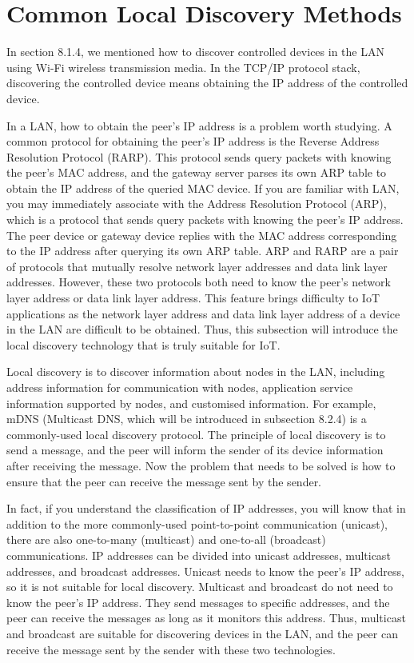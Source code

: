 \documentclass[a4paper,12pt]{book}
\begin{document}
\section{Common Local Discovery Methods}
In section 8.1.4, we mentioned how to discover controlled devices in the LAN using Wi-Fi wireless transmission media. In the TCP/IP protocol stack, discovering the controlled device means obtaining the IP address of the controlled device.

In a LAN, how to obtain the peer’s IP address is a problem worth studying. A common protocol for obtaining the peer’s IP address is the Reverse Address Resolution Protocol (RARP). This protocol sends query packets with knowing the peer’s MAC address, and the gateway server parses its own ARP table to obtain the IP address of the queried MAC device. If you are familiar with LAN, you may immediately associate with the Address Resolution Protocol (ARP), which is a protocol that sends query packets with knowing the peer’s IP address. The peer device or gateway device replies with the MAC address corresponding to the IP address after querying its own ARP table. ARP and RARP are a pair of protocols that mutually resolve network layer addresses and data link layer addresses. However, these two protocols both need to know the peer’s network layer address or data link layer address. This feature brings difficulty to IoT applications as the network layer address and data link layer address of a device in the LAN are difficult to be obtained. Thus, this subsection will introduce the local discovery technology that is truly suitable for IoT.

Local discovery is to discover information about nodes in the LAN, including address information for communication with nodes, application service information supported by nodes, and customised information. For example, mDNS (Multicast DNS, which will be introduced in subsection 8.2.4) is a commonly-used local discovery protocol. The principle of local discovery is to send a message, and the peer will inform the sender of its device information after receiving the message. Now the problem that needs to be solved is how to ensure that the peer can receive the message sent by the sender.

In fact, if you understand the classification of IP addresses, you will know that in addition to the more commonly-used point-to-point communication (unicast), there are also one-to-many (multicast) and one-to-all (broadcast) communications. IP addresses can be divided into unicast addresses, multicast addresses, and broadcast addresses. Unicast needs to know the peer’s IP address, so it is not suitable for local discovery. Multicast and broadcast do not need to know the peer’s IP address. They send messages to specific addresses, and the peer can receive the messages as long as it monitors this address. Thus, multicast and broadcast are suitable for discovering devices in the LAN, and the peer can receive the message sent by the sender with these two technologies.
\end{document}
